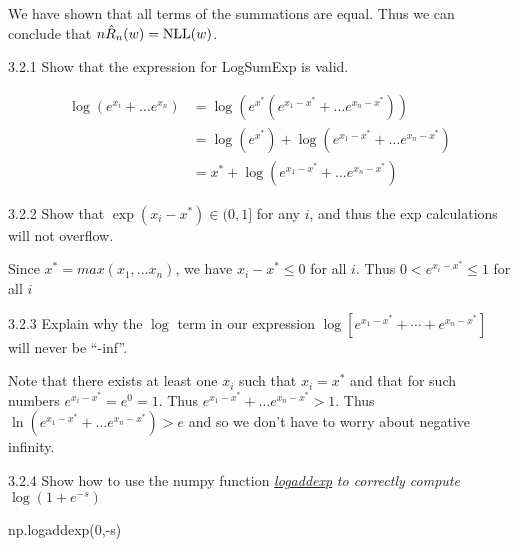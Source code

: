 \documentclass[12pt,letterpaper]{article}
\begin{document}
\begin{solution}{}
    We have shown that all terms of the summations are equal. Thus we can conclude that $n\hat{R}_{n}(w)=\text{NLL}(w)$.
\end{solution}
\newpage

\begin{problem}{3.2.1}
    Show that the expression for LogSumExp is valid.
\end{problem}
\begin{solution}{}
    \begin{align*}
        \log(e^{x_i} + \dots e^{x_n}) &= \log(e^{x^*}(e^{x_1-x^*} + \dots e^{x_n-x^*}))\\
        &= \log(e^{x^*}) + \log(e^{x_1-x^*} + \dots e^{x_n-x^*})\\
        &= x^* + \log(e^{x_1-x^*} + \dots e^{x_n-x^*})
    \end{align*}
\end{solution}
\newpage

\begin{problem}{3.2.2}
    Show that $\exp\left(x_{i}-x^{*}\right)\in(0,1]$ for any $i$, and thus the exp calculations will not overflow.
\end{problem}
\begin{solution}{}
    Since $x^*=max(x_1, \dots x_n)$, we have $x_i-x^*\leq 0$ for all $i$. Thus $0<e^{x_i-x^*}\leq1$ for all $i$
\end{solution}
\newpage

\begin{problem}{3.2.3}
    Explain why the $\log$ term in our expression
    $\log\left[e^{x_{1}-x^{*}}+\cdots+e^{x_{n}-x^{*}}\right]$ will never
    be ``-inf''.
\end{problem}
\begin{solution}{}
    Note that there exists at least one $x_i$ such that $x_i=x^*$ and that for such numbers $e^{x_i-x^*}=e^0=1$. 
    Thus $e^{x_1-x^*} + \dots e^{x_n-x^*} > 1$. Thus $\ln(e^{x_1-x^*} + \dots e^{x_n-x^*}) > e$ and so we don't have to worry
    about negative infinity.
\end{solution}
\newpage

\begin{problem}{3.2.4}
    Show how to use the numpy function\textit{ \href{https://docs.scipy.org/doc/numpy/reference/generated/numpy.logaddexp.html}{logaddexp}
    }\textit{\emph{to correctly compute $\log\left(1+e^{-s}\right)$}}
\end{problem}
\begin{solution}{}
    np.logaddexp(0,-s)
\end{solution}
\newpage
\end{document}
